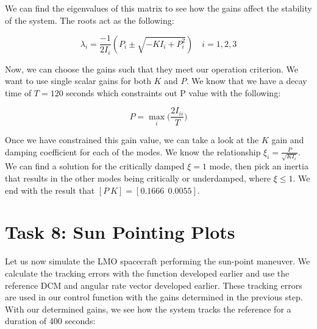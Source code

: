 \documentclass[paper]{aiaaNew}
\begin{document}
We can find the eigenvalues of this matrix to see how the gains affect the stability of the system. The roots act as the following:

\begin{equation}
  \lambda_i = \frac{-1}{2I_i} \left(P_{i} \pm \sqrt{-K I_{i}+P_{i}^{2}}\right) \quad i=1,2,3
\end{equation}

Now, we can choose the gains such that they meet our operation criterion. We want to use single scalar gains for both $K$ and $P$. We know that we have a decay time of $T=120$ seconds which constraints out P value with the following:

\begin{equation}
  P = \max_i \bigg (\frac{2I_{ii}}{T}  \bigg)
\end{equation}

Once we have constrained this gain value, we can take a look at the $K$ gain and damping coefficient for each of the modes. We know the relationship $\xi_i=\frac{P}{\sqrt{KI_i}}$. We can find a solution for the critically damped $\xi = 1$ mode, then pick an inertia that results in the other modes being critically or underdamped, where $\xi \leq 1 $. We end with the result that $[P \  K] = [0.1666  \ \ 0.0055]$.









\section*{Task 8: Sun Pointing Plots}
Let us now simulate the LMO spacecraft performing the sun-point maneuver. We calculate the tracking errors with the function developed earlier and use the reference DCM and angular rate vector developed earlier. These tracking errors are used in our control function with the gains determined in the previous step. With our determined gains, we see how the system tracks the reference for a duration of 400 seconds:
\end{document}
